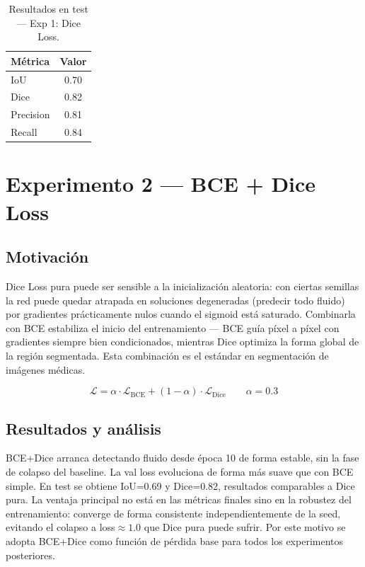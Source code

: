\documentclass[12pt,a4paper]{article}
\begin{document}
\begin{table}[H]
\centering
\caption{Resultados en test — Exp 1: Dice Loss.}
\label{tab:exp1}
\begin{tabular}{lc}
\toprule
Métrica & Valor \\
\midrule
IoU       & 0.70 \\
Dice      & 0.82 \\
Precision & 0.81 \\
Recall    & 0.84 \\
\bottomrule
\end{tabular}
\end{table}

\section{Experimento 2 — BCE + Dice Loss}

\subsection{Motivación}

Dice Loss pura puede ser sensible a la inicialización aleatoria: con ciertas semillas la red puede quedar atrapada en soluciones degeneradas (predecir todo fluido) por gradientes prácticamente nulos cuando el sigmoid está saturado. Combinarla con BCE estabiliza el inicio del entrenamiento — BCE guía píxel a píxel con gradientes siempre bien condicionados, mientras Dice optimiza la forma global de la región segmentada. Esta combinación es el estándar en segmentación de imágenes médicas.

\begin{equation}
    \mathcal{L} = \alpha \cdot \mathcal{L}_{\text{BCE}} + (1 - \alpha) \cdot \mathcal{L}_{\text{Dice}}
    \qquad \alpha = 0.3
\end{equation}

\subsection{Resultados y análisis}

BCE+Dice arranca detectando fluido desde época 10 de forma estable, sin la fase de colapso del baseline. La val loss evoluciona de forma más suave que con BCE simple. En test se obtiene IoU=0.69 y Dice=0.82, resultados comparables a Dice pura. La ventaja principal no está en las métricas finales sino en la robustez del entrenamiento: converge de forma consistente independientemente de la seed, evitando el colapso a loss$\approx 1.0$ que Dice pura puede sufrir. Por este motivo se adopta BCE+Dice como función de pérdida base para todos los experimentos posteriores.
\end{document}
